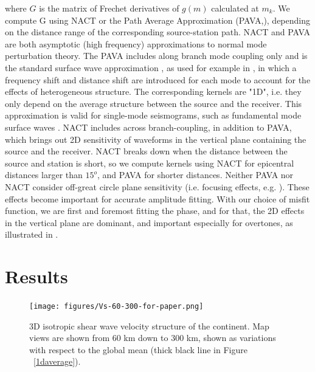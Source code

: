 \documentclass[12pt]{article}
\begin{document}
where $G$ is the matrix of Frechet derivatives of $g(m)$ calculated at $m_k$. We compute G using NACT or the Path Average Approximation (PAVA,\cite{woodhouse1984mapping}), depending on the distance range of the corresponding source-station path.
NACT and PAVA are both asymptotic (high frequency) approximations to normal mode perturbation theory. 
The PAVA includes along branch mode coupling only and is the standard surface wave approximation \citep[e.g][]{mochizuki1986free,romanowicz1987multiplet}, as used for example in \cite{woodhouse1984mapping}, in which a frequency shift and distance shift are introduced for each mode to account for the effects of heterogeneous structure. 
The corresponding kernels are "1D", i.e. they only depend on the average structure between the source and the receiver. This approximation is valid for single-mode seismograms, such as fundamental mode surface waves \citep[e.g][]{romanowicz2008computation}.
NACT includes across branch-coupling, in addition to PAVA, which brings out 2D sensitivity of waveforms in the vertical plane containing the source and the receiver. NACT breaks down when the distance between the source and station is short, so we compute kernels using NACT for epicentral distances larger than $15^o$, and PAVA for shorter distances.
Neither PAVA nor NACT consider off-great circle plane sensitivity (i.e. focusing effects, e.g. \cite{zhou2005finite}). These effects become important for accurate amplitude fitting. With our choice of misfit function, we are first and foremost fitting the phase, and for that, the 2D effects in the vertical plane are dominant, and important especially for overtones, as illustrated in \cite{romanowicz2008computation}.


\section{Results}

\begin{figure}[p]
	\centering
	\texttt{[image: figures/Vs-60-300-for-paper.png]}

	\caption{\baselineskip 18pt
	3D isotropic shear wave velocity structure of the continent. Map views are shown from 60 km down to 300 km, shown as variations with respect to the global mean (thick black line in Figure ~\ref{1daverage}). 
	}

	\label{3d-VS}

\end{figure}
\end{document}
